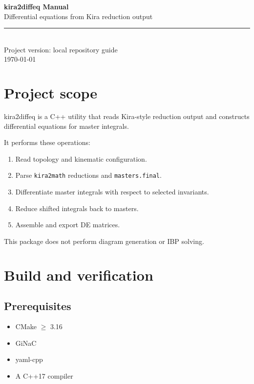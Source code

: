 \documentclass[11pt,openany]{report}
\newcommand{\code}[1]{\texttt{#1}}
\begin{document}
\begin{titlepage}
  \begin{center}
    \vspace*{3cm}
    {\Huge\bfseries kira2diffeq Manual}\\[1em]
    {\large Differential equations from Kira reduction output}\\[2cm]
    \rule{12cm}{0.5pt}\\[1cm]
    {\large Project version: local repository guide}\\[0.8cm]
    {\normalsize\today}\\[2cm]
    \vfill
  \end{center}
\end{titlepage}

\tableofcontents
\clearpage

\chapter{Project scope}
kira2diffeq{} is a C++ utility that reads Kira-style reduction output and
constructs differential equations for master integrals.

It performs these operations:
\begin{enumerate}
  \item Read topology and kinematic configuration.
  \item Parse \code{kira2math} reductions and \code{masters.final}.
  \item Differentiate master integrals with respect to selected invariants.
  \item Reduce shifted integrals back to masters.
  \item Assemble and export DE matrices.
\end{enumerate}

This package does not perform diagram generation or IBP solving.

\chapter{Build and verification}

\section{Prerequisites}
\begin{itemize}
  \item CMake $\ge$ 3.16
  \item GiNaC
  \item yaml-cpp
  \item A C++17 compiler
\end{itemize}
\end{document}
